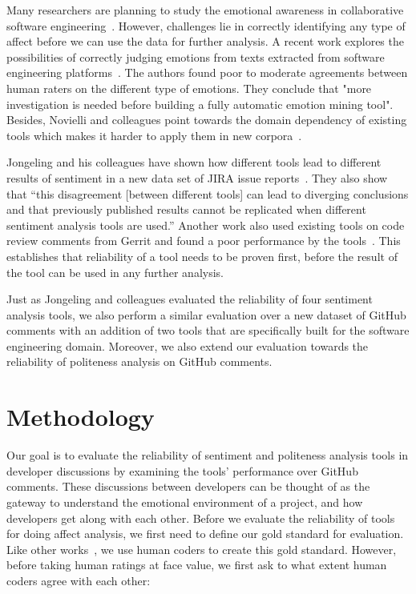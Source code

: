 Many researchers are planning to study 
the emotional awareness in collaborative software engineering~\cite{dewan2015towards}. 
However, challenges lie in correctly identifying any type of affect before we can use the data for further analysis. 
A recent work explores the possibilities of correctly judging emotions from texts extracted from software engineering platforms~\cite{murgia2014developers}. 
The authors found 
poor to moderate agreements between human raters 
on the different type of emotions. 
They conclude that 
"more investigation is needed before 
building a fully automatic emotion mining tool". 
Besides, Novielli and colleagues point towards 
the domain dependency of existing tools 
which makes it harder to apply them in new corpora~\cite{novielli2015challenges}. 

Jongeling and his colleagues have shown 
how different tools lead to different results of sentiment 
in a new data set of JIRA issue reports~\cite{jongeling2017negative}. They also show that ``this disagreement [between different tools] 
can lead to diverging conclusions 
and that previously published results cannot be replicated 
when different sentiment analysis tools are used.'' 
Another work also used existing tools 
on code review comments from Gerrit 
and found a poor performance by the tools~\cite{ahmed2017senticr}. This establishes that reliability of a tool needs to be proven first, before the result of the tool can be used in any further analysis.

Just as Jongeling and colleagues 
evaluated the reliability of four sentiment analysis tools, 
we also perform a similar evaluation 
over a new dataset of GitHub comments 
with an addition of two tools 
that are specifically built for the software engineering domain. Moreover, we also extend our evaluation 
towards the reliability of politeness analysis 
on GitHub comments.  
   

\section{Methodology}

Our goal is to evaluate the reliability of sentiment and politeness analysis tools in developer discussions by examining the tools' performance over GitHub comments.
These discussions between developers can be thought of as the gateway to understand the emotional environment of a project, and how developers get along with each other. 
Before we evaluate the reliability of tools for doing affect analysis,
we first need to define our gold standard for evaluation.
Like other works~\cite{calefato2017sentiment,ahmed2017senticr}, we use human coders to create
this gold standard.
However, before taking human ratings at face value, we first ask
to what extent human coders agree with each other:

